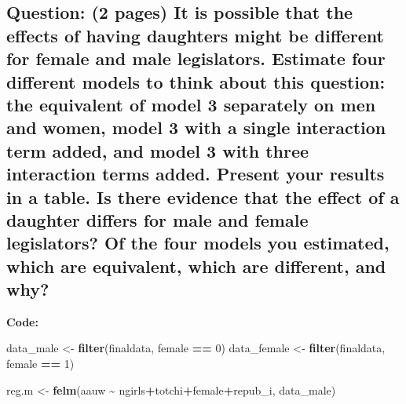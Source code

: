 \documentclass[
]{article}
\newenvironment{Shaded}{\begin{snugshade}}{\end{snugshade}}
\newcommand{\DecValTok}[1]{\textcolor[rgb]{0.00,0.00,0.81}{#1}}
\newcommand{\FunctionTok}[1]{\textcolor[rgb]{0.13,0.29,0.53}{\textbf{#1}}}
\newcommand{\NormalTok}[1]{#1}
\newcommand{\OtherTok}[1]{\textcolor[rgb]{0.56,0.35,0.01}{#1}}
\newcommand{\SpecialCharTok}[1]{\textcolor[rgb]{0.81,0.36,0.00}{\textbf{#1}}}
\begin{document}
\hypertarget{question-2-pages-it-is-possible-that-the-effects-of-having-daughters-might-be-different-for-female-and-male-legislators.-estimate-four-different-models-to-think-about-this-question-the-equivalent-of-model-3-separately-on-men-and-women-model-3-with-a-single-interaction-term-added-and-model-3-with-three-interaction-terms-added.-present-your-results-in-a-table.-is-there-evidence-that-the-effect-of-a-daughter-differs-for-male-and-female-legislators-of-the-four-models-you-estimated-which-are-equivalent-which-are-different-and-why}{%
\subsection{Question: (2 pages) It is possible that the effects of
having daughters might be different for female and male legislators.
Estimate four different models to think about this question: the
equivalent of model 3 separately on men and women, model 3 with a single
interaction term added, and model 3 with three interaction terms added.
Present your results in a table. Is there evidence that the effect of a
daughter differs for male and female legislators? Of the four models you
estimated, which are equivalent, which are different, and
why?}\label{question-2-pages-it-is-possible-that-the-effects-of-having-daughters-might-be-different-for-female-and-male-legislators.-estimate-four-different-models-to-think-about-this-question-the-equivalent-of-model-3-separately-on-men-and-women-model-3-with-a-single-interaction-term-added-and-model-3-with-three-interaction-terms-added.-present-your-results-in-a-table.-is-there-evidence-that-the-effect-of-a-daughter-differs-for-male-and-female-legislators-of-the-four-models-you-estimated-which-are-equivalent-which-are-different-and-why}}

\textbf{Code:}

\begin{Shaded}
\begin{Highlighting}[]
\NormalTok{data\_male }\OtherTok{\textless{}{-}} \FunctionTok{filter}\NormalTok{(finaldata, female }\SpecialCharTok{==} \DecValTok{0}\NormalTok{)}
\NormalTok{data\_female }\OtherTok{\textless{}{-}} \FunctionTok{filter}\NormalTok{(finaldata, female }\SpecialCharTok{==} \DecValTok{1}\NormalTok{)}

\NormalTok{reg.m }\OtherTok{\textless{}{-}} \FunctionTok{felm}\NormalTok{(aauw }\SpecialCharTok{\textasciitilde{}}\NormalTok{ ngirls}\SpecialCharTok{+}\NormalTok{totchi}\SpecialCharTok{+}\NormalTok{female}\SpecialCharTok{+}\NormalTok{repub\_i, data\_male)}
\end{Highlighting}
\end{Shaded}
\end{document}
